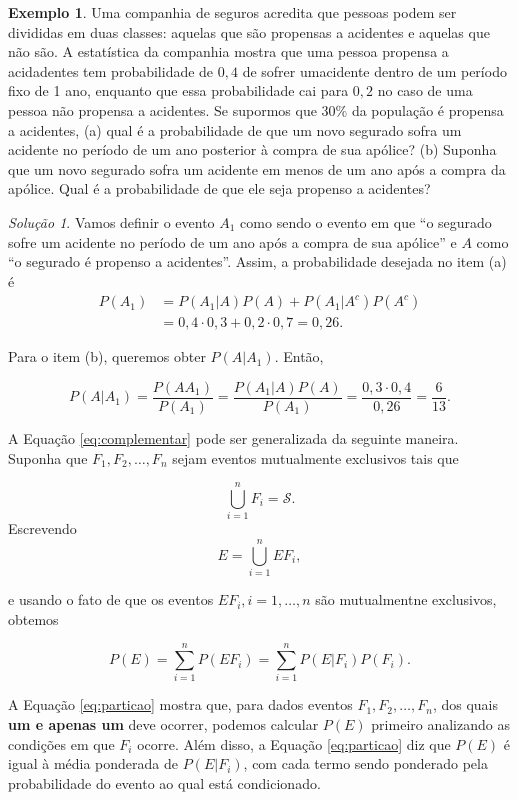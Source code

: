 \documentclass[]{book}
\theoremstyle{definition}
\theoremstyle{definition}
\newtheorem{example}{Exemplo}[chapter]
\theoremstyle{definition}
\theoremstyle{remark}
\newtheorem*{solution}{Solução}
\begin{document}
\begin{example}
\protect\hypertarget{exm:unnamed-chunk-154}{}{\label{exm:unnamed-chunk-154} }Uma companhia de seguros acredita que pessoas podem ser divididas em duas classes: aquelas que são propensas a acidentes e aquelas que não são.
A estatística da companhia mostra que uma pessoa propensa a acidadentes tem probabilidade de \(0{,}4\) de sofrer umacidente dentro de um período fixo de 1 ano, enquanto que essa probabilidade cai para \(0{,}2\) no caso de uma pessoa não propensa a acidentes.
Se supormos que \(30\%\) da população é propensa a acidentes, (a) qual é a probabilidade de que um novo segurado sofra um acidente no período de um ano posterior à compra de sua apólice?
(b) Suponha que um novo segurado sofra um acidente em menos de um ano após a compra da apólice.
Qual é a probabilidade de que ele seja propenso a acidentes?
\end{example}

\begin{solution}
\iffalse{} {Solução. } \fi{}Vamos definir o evento \(A_1\) como sendo o evento em que ``o segurado sofre um acidente no período de um ano após a compra de sua apólice'' e \(A\) como ``o segurado é propenso a acidentes''.
Assim, a probabilidade desejada no item (a) é
\begin{align}
P(A_1) &= P(A_1|A)P(A) + P(A_1|A^c)P(A^c)\\
&= 0{,}4\cdot 0{,}3 + 0{,}2\cdot 0{,}7 = 0{,}26.
\end{align}

Para o item (b), queremos obter \(P(A|A_1)\).
Então,

\[P(A|A_1) = \frac{P(A A_1)}{P(A_1)} = \frac{P(A_1|A)P(A)}{P(A_1)} = \frac{ 0{,}3\cdot 0{,}4}{ 0{,}26} = \frac{6}{13}.\]
\end{solution}

A Equação \eqref{eq:complementar} pode ser generalizada da seguinte maneira.
Suponha que \(F_1, F_2, \ldots, F_n\) sejam eventos mutualmente exclusivos tais que

\[\bigcup_{i=1}^{n}F_i=\mathcal{S}.\]
Escrevendo \[E = \bigcup_{i=1}^{n}EF_i,\]

e usando o fato de que os eventos \(EF_i, i=1,\ldots, n\) são mutualmentne exclusivos, obtemos

\begin{equation}
P(E) =  \sum_{i=1}^{n}P(EF_i) = \sum_{i=1}^{n}P(E|F_i)P(F_i).
\label{eq:particao}
\end{equation}

A Equação \eqref{eq:particao} mostra que, para dados eventos \(F_1, F_2, \ldots, F_n\), dos quais \textbf{um e apenas um} deve ocorrer, podemos calcular \(P(E)\) primeiro analizando as condições em que \(F_i\) ocorre.
Além disso, a Equação \eqref{eq:particao} diz que \(P(E)\) é igual à média ponderada de \(P(E|F_i)\), com cada termo sendo ponderado pela probabilidade do evento ao qual está condicionado.
\end{document}
